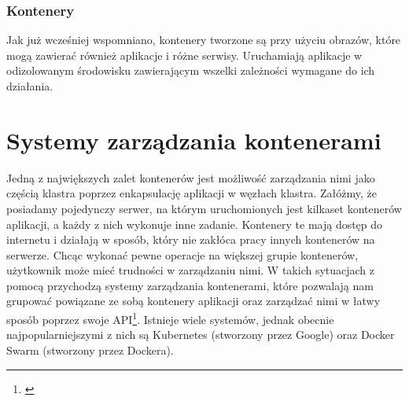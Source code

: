 \documentclass[12pt]{report}
\let\Oldsection\section
\renewcommand{\section}{\FloatBarrier\Oldsection}
\let\Oldsubsubsection\subsubsection
\renewcommand{\subsubsection}{\FloatBarrier\Oldsubsubsection}
\begin{document}
\subsubsection{Kontenery}
Jak już wcześniej wspomniano, kontenery tworzone są przy użyciu obrazów, które mogą zawierać również aplikacje i różne serwisy. Uruchamiają aplikacje w odizolowanym środowisku zawierającym wszelki zależności wymagane do ich działania. 

\section{Systemy zarządzania kontenerami}
Jedną z największych zalet kontenerów jest możliwość zarządzania nimi jako częścią klastra poprzez enkapsulację aplikacji w węzłach klastra. Załóżmy, że posiadamy pojedynczy serwer, na którym uruchomionych jest kilkaset kontenerów aplikacji, a każdy z nich wykonuje inne zadanie. Kontenery te mają dostęp do internetu i działają w sposób, który nie zakłóca pracy innych kontenerów na serwerze. Chcąc wykonać pewne operacje na większej grupie kontenerów, użytkownik może mieć trudności w zarządzaniu nimi. W takich sytuacjach z pomocą przychodzą systemy zarządzania kontenerami, które pozwalają nam grupować powiązane ze sobą kontenery aplikacji oraz zarządzać nimi w łatwy sposób poprzez swoje API\footnote{\cite{}}. Istnieje wiele systemów, jednak obecnie najpopularniejszymi z nich są Kubernetes (stworzony przez Google) oraz Docker Swarm (stworzony przez Dockera).
\end{document}

